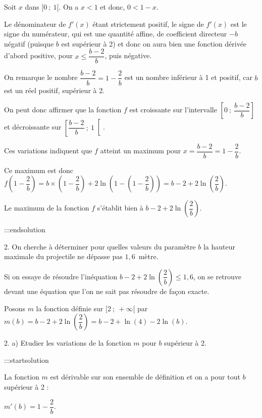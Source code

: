 \documentclass{cornouaille}
\begin{document}
\smallskip

Soit $x$ dans $[0~;~1[$. On a $x < 1$ et donc, $0< 1  -x$.

Le dénominateur de $f'(x)$ étant strictement positif, le signe de $f'(x)$ est le signe du numérateur, qui est une quantité affine, de coefficient directeur $- b$ négatif (puisque $b$ est supérieur à 2) et donc on aura bien une fonction dérivée d'abord positive, pour $x \leqslant \dfrac{b - 2}{b}$, puis négative.

On remarque le nombre $\dfrac{b-2}{b} = 1 - \dfrac{2}{b}$ est un nombre inférieur à 1 et positif, car $b$ est un réel positif, supérieur à 2.

On peut donc affirmer que la fonction $f$ est croissante sur l'intervalle $\left[0~;~\dfrac{b - 2}{b}\right] $ et décroissante sur $\left[\dfrac{b - 2}{b}~;~1\right[$.

Ces variations indiquent que $f$ atteint un maximum pour $x = \dfrac{b - 2}{b} = 1 - \dfrac{2}{b}$.

Ce maximum est donc $f\left(1 - \dfrac{2}{b}\right) = b\times \left(1 - \dfrac{2}{b}\right) + 2\ln\left(1 - \left(1 - \dfrac{2}{b} \right) \right) = b - 2 + 2 \ln\left(\dfrac{2}{b}\right) $.

Le maximum de la fonction $f$ s'établit bien à $b - 2 + 2 \ln\left(\dfrac{2}{b}\right) $.


:::endsolution





2.   On cherche à déterminer pour quelles valeurs du paramètre $b$ la hauteur maximale du projectile ne dépasse
pas $1,6$~mètre.

Si on essaye de résoudre l'inéquation $b - 2 + 2 \ln\left(\dfrac{2}{b}\right) \leqslant 1,6$, on se retrouve devant une équation que l'on ne sait pas résoudre de façon exacte.

Posons $m$ la fonction définie sur $[2~;~+\infty[$ par $m(b) = b - 2 + 2 \ln\left(\dfrac{2}{b}\right) = b - 2 + \ln(4) - 2\ln(b)$.





2. a)  Etudier les variations de la fonction $m$ pour $b$ supérieur à 2.


:::startsolution

La fonction $m$ est dérivable sur son ensemble de définition et on a pour tout $b$ supérieur à 2 :

$m'(b) = 1 - \dfrac{2}{b}$.
\end{document}
